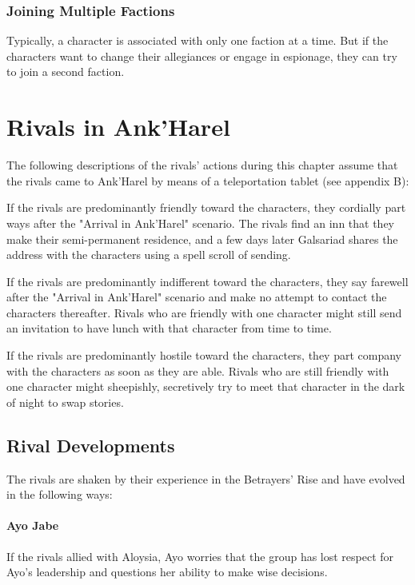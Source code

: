 \documentclass[10pt,a4paper,twoside,twocolumn,openany,nodeprecatedcode]{dndbook}
\begin{document}
\subsubsection{Joining Multiple Factions}
Typically, a character is associated with only one faction at a time. But if the characters want to change their allegiances or engage in espionage, they can try to join a second faction.

\section{Rivals in Ank'Harel}
The following descriptions of the rivals' actions during this chapter assume that the rivals came to Ank'Harel by means of a teleportation tablet (see appendix B):


\begin{description}[nolistsep]
\item[Friendly Rivals.]
If the rivals are predominantly friendly toward the characters, they cordially part ways after the "Arrival in Ank'Harel" scenario. The rivals find an inn that they make their semi-permanent residence, and a few days later Galsariad shares the address with the characters using a spell scroll of sending.
\item[Indifferent Rivals.]
If the rivals are predominantly indifferent toward the characters, they say farewell after the "Arrival in Ank'Harel" scenario and make no attempt to contact the characters thereafter. Rivals who are friendly with one character might still send an invitation to have lunch with that character from time to time.
\item[Hostile Rivals.]
If the rivals are predominantly hostile toward the characters, they part company with the characters as soon as they are able. Rivals who are still friendly with one character might sheepishly, secretively try to meet that character in the dark of night to swap stories.
\end{description}

\subsection{Rival Developments}
The rivals are shaken by their experience in the Betrayers' Rise and have evolved in the following ways:

\paragraph{Ayo Jabe}
If the rivals allied with Aloysia, Ayo worries that the group has lost respect for Ayo's leadership and questions her ability to make wise decisions.
\end{document}
